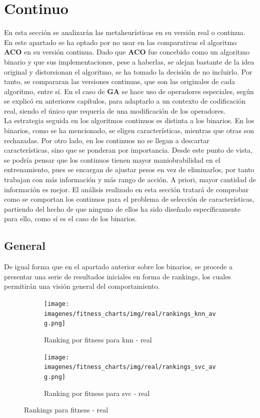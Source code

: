 \section{Continuo}
En esta sección se analizarán las metaheurísticas en su versión real o continua. En este apartado se ha optado por no usar en las comparativas el algoritmo \textbf{ACO} en su versión continua. Dado que \textbf{ACO} fue concebido como un algoritmo binario y que sus implementaciones, pese a haberlas, se alejan bastante de la idea original y distorsionan el algoritmo, se ha tomado la decisión de no incluirlo. Por tanto, se compararan las versiones continuas, que son las originales de cada algoritmo, entre sí. En el caso de \textbf{GA} se hace uso de operadores especiales, según se explicó en anteriores capítulos, para adaptarlo a un contexto de codificación real, siendo el único que requería de una modificación de los operadores.\\[6pt]
La estrategia seguida en los algoritmos continuos es distinta a los binarios. En los binarios, como se ha mencionado, se eligen características, mientras que otras son rechazadas. Por otro lado, en los continuos no se llegan a descartar características, sino que se ponderan por importancia. Desde este punto de vista, se podría pensar que los continuos tienen mayor maniobrabilidad en el entrenamiento, pues se encargan de ajustar pesos en vez de eliminarlos, por tanto trabajan con más información y más rango de acción. A priori, mayor cantidad de información es mejor. El análisis realizado en esta sección tratará de comprobar como se comportan los continuos para el problema de selección de características, partiendo del hecho de que ninguno de ellos ha sido diseñado específicamente para ello, como sí es el caso de los binarios.

\subsection{General}
De igual forma que en el apartado anterior sobre los binarios, se procede a presentar una serie de resultados iniciales en forma de rankings, los cuales permitirán una visión general del comportamiento.

\begin{figure}[htp]
    \centering
    \begin{subfigure}[htp]{1\textwidth}
        \texttt{[image: imagenes/fitness\_charts/img/real/rankings\_knn\_avg.png]}
        \caption{Ranking por fitness para knn - real}
        \label{fig:ranking_knn_real}
    \end{subfigure}
    \begin{subfigure}[htp]{1\textwidth}
        \texttt{[image: imagenes/fitness\_charts/img/real/rankings\_svc\_avg.png]}
        \caption{Ranking por fitness para svc - real}
        \label{fig:ranking_svc_real}
    \end{subfigure}
    \caption{Rankings para fitness - real}
\end{figure}

